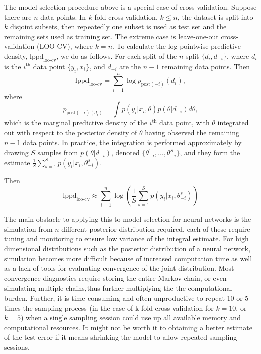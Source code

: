 \documentclass[12pt]{report}
\begin{document}
The model selection procedure above is a special case of cross-validation. Suppose there are $n$ data points. In $k$-fold cross validation,
$k\le n$, the dataset is split into $k$ disjoint subsets, then repeatedly one
subset is used as test set and the remaining sets used as training set. The
extreme case is leave-one-out cross-validation (LOO-CV), where $k=n$. To
calculate the log pointwise predictive density, $\text{lppd}_{\text{loo-cv}}$, we do as
follows. For each split of the $n$ split $\{d_i,d_{-i}\}$, where $d_i$ is the
$i^{\text{th}}$ data point $\{y_i,x_i\}$, and $d_{-i}$ are the $n-1$ remaining data points.
Then
\[ \text{lppd}_{\text{loo-cv}} = \sum_{i=1}^n \log p_{\text{post}(-i)}(d_i), \]
where 
\[p_{\text{post}(-i)(d_i)} = \int p(y_i|x_i,\theta) p(\theta |d_{-i}) d\theta, \]
which is the marginal predictive density of the $i^\text{th}$ data point, with $\theta$
integrated out with respect to the posterior density of $\theta$ having observed
the remaining $n-1$ data points. In practice, the integration is performed
approximately by drawing $S$ samples from $p(\theta|d_{-i})$, denoted
$\{\theta_{-i}^1,\dots, \theta_{-i}^S\}$, and they form the estimate
$\frac{1}{S} \sum_{s=1}^S p(y_i|x_i,\theta_{-i}^s) $.

Then
\[\text{lppd}_{\text{loo-cv}} \approx \sum_{i=1}^n \log (\frac{1}{S} \sum_{s=1}^S
p(y_i|x_i,\theta_{-i}^s))\]

The main obstacle to applying this to model selection for neural networks is the
simulation from $n$ different posterior distribution required, each of these
require tuning and monitoring to ensure low variance of the integral estimate.
For high dimensional distributions such as the posterior distribution of a neural
network, simulation becomes more difficult because of increased computation time as
well as a lack of tools for evaluating convergence of the joint distribution.
Most convergence diagnostics require storing the entire Markov chain, or even
simulating multiple chains,thus further multiplying the the computational burden. Further, it is time-consuming and often unproductive to repeat 10 or 5 times the sampling process  
(in the case of k-fold cross-validation for $k=10$, or $k=5$) when a single sampling session could use up all available memory and computational resources. 
It might not be worth it to obtaining a better estimate of the test error if it means shrinking the model to allow repeated sampling sessions.
\end{document}
